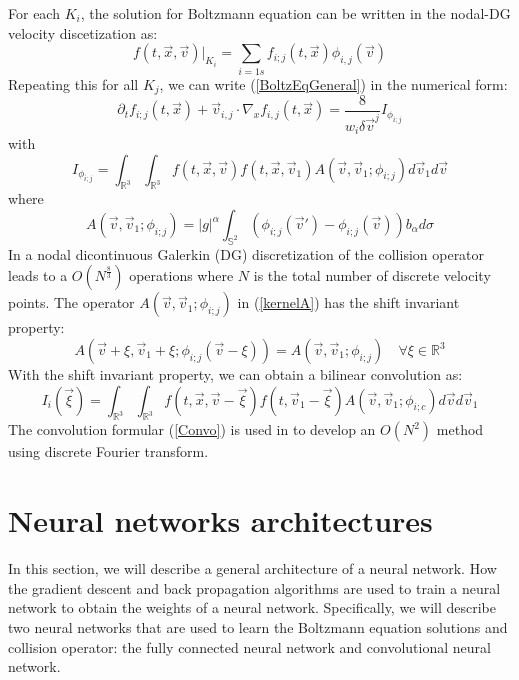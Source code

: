 \documentclass{article}
\begin{document}
For each $K_i$, the solution for Boltzmann equation can be written in the nodal-DG velocity discetization as:
\begin{equation}
	f(t,\vec{x},\vec{v})|_{K_i} = \sum_{i=1s}f_{i;j}(t,\vec{x})\phi_{i,j}(\vec{v})
\end{equation}
Repeating this for all $K_j$, we can write (\ref{BoltzEqGeneral}) in the numerical form:
\begin{equation}
\partial_tf_{i;j}(t,\vec{x}) + \vec{v}_{i,j}\cdot\nabla_xf_{i,j}(t,\vec{x}) = \frac{8}{w_i\delta\vec{v}^j}I_{\phi_{i;j}}
\end{equation}
with 
\begin{equation} \label{directColl}
I_{\phi_{i;j}} = \int_{\mathbb{R}^3}\int_{\mathbb{R}^3}f(t,\vec{x},\vec{v})f(t,\vec{x},\vec{v}_1)A(\vec{v},\vec{v}_1;\phi_{i;j})d\vec{v}_1d\vec{v}
\end{equation}
where
\begin{equation} \label{kernelA}
	A(\vec{v},\vec{v}_1;\phi_{i;j}) = |g|^\alpha\int_{\mathbb{S}^2}(\phi_{i;j}(\vec{v}') - \phi_{i;j}(\vec{v}))b_\alpha d\sigma
\end{equation}
In \cite{Alekseenko1,Alekseenko2} a nodal dicontinuous Galerkin (DG) discretization of the collision operator leads to a $O(N^{\frac{8}{3}})$ operations where $N$ is the total number of discrete velocity points.
The operator $A(\vec{v},\vec{v}_1;\phi_{i;j})$ in (\ref{kernelA}) has the shift invariant property:
\begin{equation}
A(\vec{v}+\xi,\vec{v}_1+\xi;\phi_{i;j}(\vec{v}-\xi)) = A(\vec{v},\vec{v}_1;\phi_{i;j}) \quad \forall\xi \in \mathbb{R}^3
\end{equation}
With the shift invariant property, we can obtain a bilinear convolution as:
\begin{equation} \label{Convo}
I_i(\vec{\xi}) = \int_{\mathbb{R}^3}\int_{\mathbb{R}^3}f(t,\vec{x},\vec{v} - \vec{\xi})f(t,\vec{v}_1 - \vec{\xi})A(\vec{v},\vec{v}_1;\phi_{i;c})d\vec{v}d\vec{v}_1
\end{equation}
The convolution formular (\ref{Convo}) is used in \cite{Alekseenko4} to develop an $O(N^2)$ method using discrete Fourier transform.

\section{Neural networks architectures} \label{NN}
In this section, we will describe a general architecture of a neural network. How the gradient descent and back propagation algorithms are used to train a neural network to obtain the weights of a neural network. Specifically, we will describe two neural networks that are used to learn the Boltzmann equation solutions and collision operator: the fully connected neural network and convolutional neural network.
\end{document}
